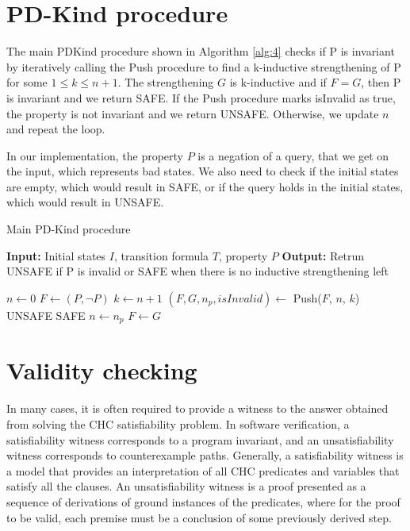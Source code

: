 \newpage 
\section{PD-Kind procedure}

\noindent The main PDKind procedure shown in Algorithm \ref{alg:4} checks if P is invariant by iteratively calling the Push procedure to find a k-inductive strengthening of P for some $1 \leq k \leq n + 1$. The strengthening $G$ is k-inductive and if $F = G$, then P is invariant and we return SAFE. If the Push procedure marks isInvalid as true, the property is not invariant and we return UNSAFE. Otherwise, we update $n$ and repeat the loop.

In our implementation, the property $P$ is a negation of a query, that we get on the input, which represents bad states. We also need to check if the initial states are empty, which would result in SAFE, or if the query holds in the initial states, which would result in UNSAFE.

\begin{algorithm}
    \caption{Main PD-Kind procedure}\label{alg:4}
\begin{algorithmic}[1]
\State \textbf{Input:} Initial states $I$, transition formula $T$, property $P$
\State \textbf{Output:} Retrun UNSAFE if P is invalid or SAFE when there is no inductive strengthening left

\State $n \gets 0$
    \State $F \gets (P, \neg P)$
        \State $k \gets n + 1$
        \State $(F, G, n_p, isInvalid) \gets$ Push($F$, $n$, $k$)
        \State \Return UNSAFE
        \EndIf
        \State \Return SAFE
        \EndIf
        \State $n \gets n_p$
        \State $F \gets G$
    \EndWhile

\end{algorithmic}
\end{algorithm}

\section{Validity checking}
\noindent In many cases, it is often required to provide a witness to the answer obtained from solving the CHC satisfiability problem. In software verification, a satisfiability witness corresponds to a program invariant, and an unsatisfiability witness corresponds to counterexample paths. Generally, a satisfiability witness is a model that provides an interpretation of all CHC predicates and variables that satisfy all the clauses. An unsatisfiability witness is a proof presented as a sequence of derivations of ground instances of the predicates, where for the proof to be valid, each premise must be a conclusion of some previously derived step.

